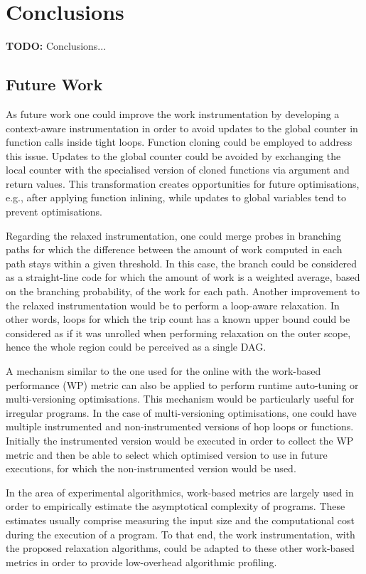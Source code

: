 \chapter{Conclusions}

\textbf{TODO:} Conclusions...

\section{Future Work}

As future work one could improve the work instrumentation by developing a context-aware instrumentation in order to avoid updates to the global counter in function calls inside tight loops.
Function cloning could be employed to address this issue.
Updates to the global counter could be avoided by exchanging the local counter with the specialised version of cloned functions via argument and return values.
This transformation creates opportunities for future optimisations, e.g., after applying function inlining, while updates to global variables tend to prevent optimisations.

Regarding the relaxed instrumentation,
one could merge probes in branching paths for which the difference between the amount of work computed in each path stays within a given threshold.
In this case, the branch could be considered as a straight-line code for which the amount of work is a weighted average, based on the branching probability, of the work for each path.
Another improvement to the relaxed instrumentation would be to perform a loop-aware relaxation.
In other words, loops for which the trip count has a known upper bound could be considered as if it was unrolled when performing relaxation on the outer scope, hence the whole region could be perceived as a single DAG.

A mechanism similar to the one used for the online {\itercomp} with the work-based performance (WP) metric can also be applied to perform
runtime auto-tuning or multi-versioning optimisations.
This mechanism would be particularly useful for irregular programs.
In the case of multi-versioning optimisations, one could have multiple instrumented and non-instrumented versions of hop loops or functions.
Initially the instrumented version would be executed in order to collect the WP metric and then be able to select which optimised version to use in future executions, 
for which the non-instrumented version would be used.

In the area of experimental algorithmics, work-based metrics are largely used in order to empirically estimate the asymptotical complexity of programs.
These estimates usually comprise measuring the input size and the computational cost during the execution of a program.
To that end, the work instrumentation, with the proposed relaxation algorithms, could be adapted to these other work-based metrics in order to provide low-overhead algorithmic profiling.
